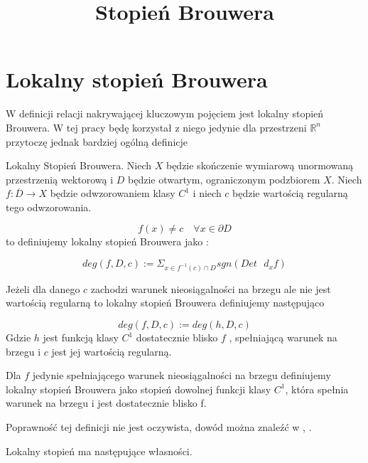 \title{Stopień Brouwera}

\section{Lokalny stopień Brouwera}

W definicji relacji nakrywającej kluczowym pojęciem jest lokalny stopień Brouwera.
W tej pracy będę korzystał z niego jedynie dla przestrzeni $ \mathbb R^n $ 
przytoczę jednak bardziej ogólną definicje

\begin{definition} {Lokalny Stopień Brouwera.}
  Niech $X$ będzie skończenie wymiarową unormowaną przestrzenią wektorową i $ D $ będzie otwartym, ograniczonym podzbiorem $ X $.
  Niech $ f : \overline D \to X $ będzie odwzorowaniem klasy $ C^1 $ i niech $c$ będzie wartością regularną tego odwzorowania. 
  
  \begin{equation}
    f(x) \neq c  \quad \forall x \in \partial D 
  \end{equation}
to definiujemy lokalny stopień Brouwera jako : 
  
  \begin{equation}
    deg(f,D,c) := \Sigma_{x \in f^{-1}(c)\cap D} sgn(Det \mbox{ } d_x f)
  \end{equation}
  
  Jeżeli dla danego $ c $ zachodzi warunek nieosiągalności na brzegu ale nie jest wartością regularną to lokalny stopień Brouwera
  definiujemy następująco
  
    \begin{equation}
      deg(f,D,c) := deg(h,D,c)
    \end{equation}
    Gdzie $h$ jest funkcją klasy $ C^1 $ dostatecznie blisko $f$ , spełniającą warunek na brzegu i $ c $ jest jej wartością regularną.
    
    Dla $ f $ jedynie spełniającego warunek nieosiągalności na brzegu definiujemy lokalny stopień Brouwera jako stopień 
    dowolnej funkcji klasy $ C^1 $, która spełnia warunek na brzegu i jest dostatecznie blisko f.
  

\end{definition}

Poprawność tej definicji nie jest oczywista, dowód można znaleźć w \cite{N} , \cite{Sch}.

Lokalny stopień ma następujące własności.

